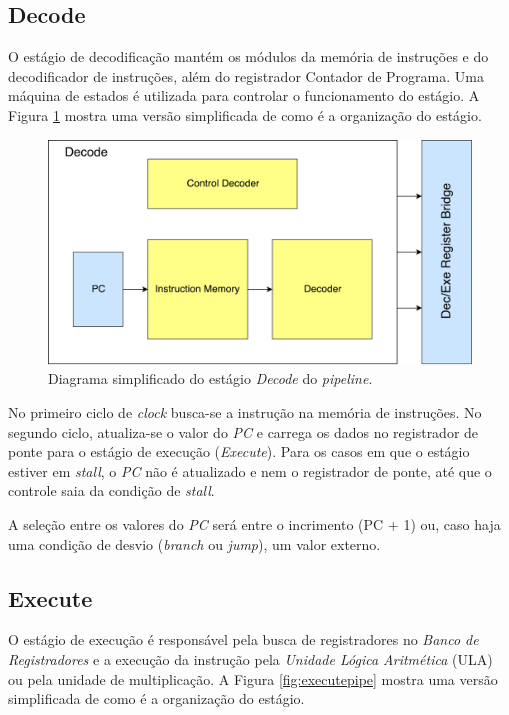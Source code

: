 \documentclass[11pt,a4paper,titlepage]{article}
\begin{document}
\subsection{Decode}

O estágio de decodificação mantém os módulos da memória de instruções e do decodificador de instruções, além do registrador Contador de Programa. Uma máquina de estados é utilizada para controlar o funcionamento do estágio. A Figura \ref{fig:decodepipe} mostra uma versão simplificada de como é a organização do estágio.

\begin{figure}[!h]
\centering
\includegraphics[scale=0.4]{images/decodepipe.pdf}
\caption{Diagrama simplificado do estágio \textit{Decode} do \textit{pipeline}.}
\label{fig:decodepipe}
\end{figure}

No primeiro ciclo de \textit{clock} busca-se a instrução na memória de instruções. No segundo ciclo, atualiza-se o valor do \textit{PC} e carrega os dados no registrador de ponte para o estágio de execução (\textit{Execute}). Para os casos em que o estágio estiver em \textit{stall}, o \textit{PC} não é atualizado e nem o registrador de ponte, até que o controle saia da condição de \textit{stall}.

A seleção entre os valores do \textit{PC} será entre o incrimento (PC + 1) ou, caso haja uma condição de desvio (\textit{branch} ou \textit{jump}), um valor externo.

\subsection{Execute}

O estágio de execução é responsável pela busca de registradores no \textit{Banco de Registradores} e a execução da instrução pela \textit{Unidade Lógica Aritmética} (ULA) ou pela unidade de multiplicação. A Figura \ref{fig:executepipe} mostra uma versão simplificada de como é a organização do estágio.
\end{document}

